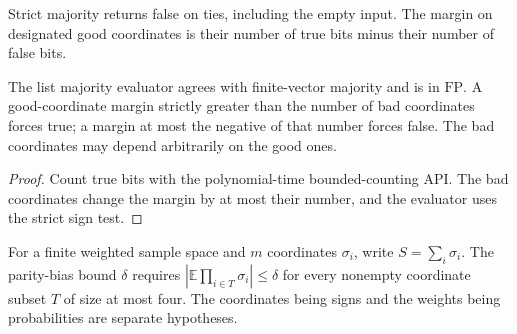 \begin{definition}
  \label{def:lowerbounds-algebraic-extractor-majority}
  \leanok
  Strict majority returns false on ties, including the empty input.
  The margin on designated good coordinates is their number of true bits
  minus their number of false bits.
\end{definition}

\begin{theorem}
  \label{thm:lowerbounds-algebraic-extractor-majority}
  \leanok
  The list majority evaluator agrees with finite-vector majority and is
  in $\mathrm{FP}$. A good-coordinate margin strictly greater than the
  number of bad coordinates forces true; a margin at most the negative
  of that number forces false. The bad coordinates may depend arbitrarily
  on the good ones.
\end{theorem}
\begin{proof}
  \leanok
  Count true bits with the polynomial-time bounded-counting API.
  The bad coordinates change the margin by at most their number, and the
  evaluator uses the strict sign test.
\end{proof}

\begin{definition}
  \label{def:lowerbounds-algebraic-parity-bias}
  \leanok
  For a finite weighted sample space and $m$ coordinates $\sigma_i$,
  write $S=\sum_i\sigma_i$. The parity-bias bound $\delta$ requires
  $|\mathbb E\prod_{i\in T}\sigma_i|\le\delta$ for every nonempty
  coordinate subset $T$ of size at most four. The coordinates being
  signs and the weights being probabilities are separate hypotheses.
\end{definition}

